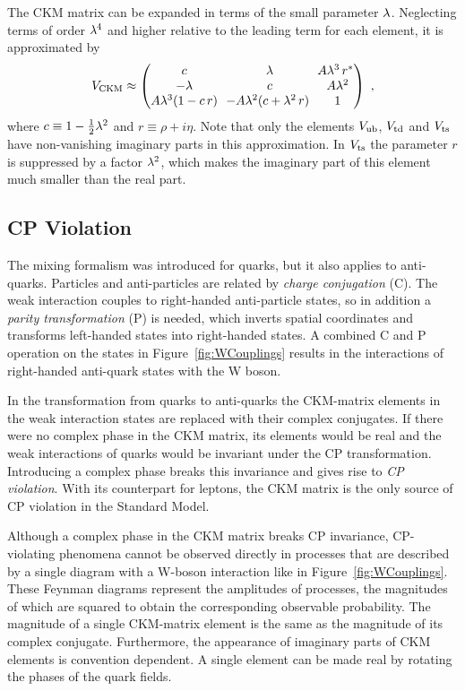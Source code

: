 The CKM matrix can be expanded in terms of the small parameter $\lambda$. Neglecting terms of order $\lambda^4$ and higher relative to the
leading term for each element, it is approximated by \cite{Charles:2004jd}
\begin{equation}
  \label{eq:CKMApprox}
  V_\text{CKM} \approx
    \begin{pmatrix}
      c                  &  \lambda                           &  \!\! A\lambda^3\,r^* \\
      -\lambda              &  c                              &  A\lambda^2           \\
      A\lambda^3(1 - c\,r)  &  \!\! -A\lambda^2 (c + \lambda^2\,r)  &  1
    \end{pmatrix}
    \ ,
\end{equation}
where $c\equiv1 - \tfrac{1}{2}\lambda^2$ and $r\equiv\rho+i\eta$. Note that only the elements $V_\text{ub}$, $V_\text{td}$ and $V_\text{ts}$ have non-vanishing
imaginary parts in this approximation. In $V_\text{ts}$ the parameter $r$ is suppressed by a factor $\lambda^2$, which makes the imaginary part of
this element much smaller than the real part.


\subsection{CP Violation}

The mixing formalism was introduced for quarks, but it also applies to anti-quarks. Particles and anti-particles are related by
\emph{charge conjugation} (C). The weak interaction couples to right-handed anti-particle states, so in addition a \emph{parity
transformation} (P) is needed, which inverts spatial coordinates and transforms left-handed states into right-handed states. A combined C
and P operation on the states in Figure~\ref{fig:WCouplings} results in the interactions of right-handed anti-quark states with the W
boson.

In the transformation from quarks to anti-quarks the CKM-matrix elements in the weak interaction states are replaced with their complex
conjugates. If there were no complex phase in the CKM matrix, its elements would be real and the weak interactions of quarks would be
invariant under the CP transformation. Introducing a complex phase breaks this invariance and gives rise to \emph{CP violation}. With its
counterpart for leptons, the CKM matrix is the only source of CP violation in the Standard Model.

Although a complex phase in the CKM matrix breaks CP invariance, CP-violating phenomena cannot be observed directly in processes that are
described by a single diagram with a W-boson interaction like in Figure~\ref{fig:WCouplings}. These Feynman diagrams represent the
amplitudes of processes, the magnitudes of which are squared to obtain the corresponding observable probability. The magnitude of a single
CKM-matrix element is the same as the magnitude of its complex conjugate. Furthermore, the appearance of imaginary parts of CKM elements is
convention dependent. A single element can be made real by rotating the phases of the quark fields.

